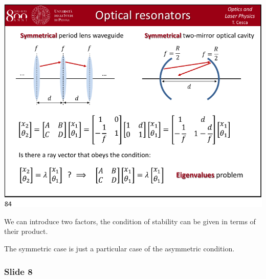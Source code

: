 \documentclass[../main/main.tex]{subfiles}
\begin{document}
\begin{minipage}[]{0.5\linewidth}
\centering
\includegraphics[page=7,width=1\textwidth]{../lessons/pdf_file/21_lecture.pdf}
\end{minipage}
\hspace{0.3cm}\vspace{0.3cm}
\begin{minipage}[c]{0.47\linewidth}

We can introduce two factors, the condition of stability can be given in terms of their product.

The symmetric case is just a particular case of the asymmetric condition.

\end{minipage}

\subsubsection*{Slide 8}
\end{document}
